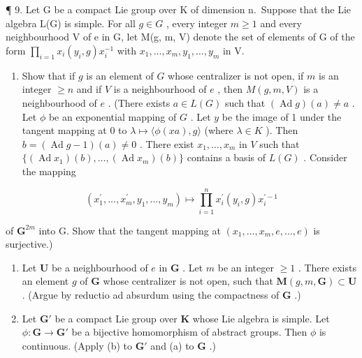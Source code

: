 ¶ 9. Let G be a compact Lie group over K of dimension n.~Suppose that the Lie algebra L(G) is simple. For all \(g \in G\) , every integer \(m \geqslant 1\) and every neighbourhood V of e in G, let M(g, m, V) denote the set of elements of G of the form \(\prod_{i=1} x_i(y_i, g) x_i^{-1}\) with \(x_1, \ldots, x_m, y_1, \ldots, y_m\) in V.

\begin{enumerate}
\def\labelenumi{(\alph{enumi})}
\tightlist
\item
  Show that if \(g\) is an element of \(G\) whose centralizer is not open, if \(m\) is an integer \(\geqslant n\) and if \(V\) is a neighbourhood of \(e\) , then \(M(g, m, V)\) is a neighbourhood of \(e\) . (There exists \(a \in L(G)\) such that \((\operatorname{Ad} g)(a) \neq a\) . Let \(\phi\) be an exponential mapping of \(G\) . Let \(y\) be the image of 1 under the tangent mapping at 0 to \(\lambda \mapsto \langle \phi(xa), g \rangle\) (where \(\lambda \in K\) ). Then \(b = (\operatorname{Ad} g - 1)(a) \neq 0\) . There exist \(x_1, \ldots, x_m\) in \(V\) such that \(\{(\operatorname{Ad} x_1)(b), \ldots, (\operatorname{Ad} x_m)(b)\}\) contains a basis of \(L(G)\) . Consider the mapping
\end{enumerate}

\[
\left(x _ {1} ^ {\prime}, \dots , x _ {m} ^ {\prime}, y _ {1}, \dots , y _ {m}\right) \mapsto \prod_ {i = 1} ^ {n} x _ {i} ^ {\prime} (y _ {i}, g) x _ {i} ^ {\prime - 1}
\]

of \(\mathbf{G}^{2m}\) into G. Show that the tangent mapping at \((x_{1},\ldots ,x_{m},e,\ldots ,e)\) is surjective.)

\begin{enumerate}
\def\labelenumi{(\alph{enumi})}
\setcounter{enumi}{1}
\item
  Let \(\mathbf{U}\) be a neighbourhood of \(e\) in \(\mathbf{G}\) . Let \(m\) be an integer \(\geqslant 1\) . There exists an element \(g\) of \(\mathbf{G}\) whose centralizer is not open, such that \(\mathbf{M}(g, m, \mathbf{G}) \subset \mathbf{U}\) . (Argue by reductio ad absurdum using the compactness of \(\mathbf{G}\) .)
\item
  Let \(\mathbf{G}'\) be a compact Lie group over \(\mathbf{K}\) whose Lie algebra is simple. Let \(\phi: \mathbf{G} \to \mathbf{G}'\) be a bijective homomorphism of abstract groups. Then \(\phi\) is continuous. (Apply (b) to \(\mathbf{G}'\) and (a) to \(\mathbf{G}\) .)
\end{enumerate}

